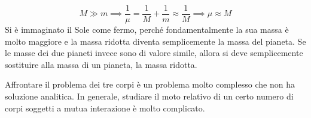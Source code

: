 \documentclass[10pt,a4paper]{book}
\begin{document}
\[
	M \gg m \implies \frac{1}{\mu}=\frac{1}{M}+\frac{1}{m}  \approx \frac{1}{M} \implies \mu \approx M
\]
Si è immaginato il Sole come fermo, perché fondamentalmente la sua massa è molto maggiore e la massa ridotta diventa semplicemente la massa del pianeta. Se le masse dei due pianeti invece sono di valore simile, allora si deve semplicemente sostituire alla massa di un pianeta, la massa ridotta.

Affrontare il problema dei tre corpi è un problema molto complesso che non ha soluzione analitica. In generale, studiare il moto relativo di un certo numero di corpi soggetti a mutua interazione è molto complicato.
\end{document}
